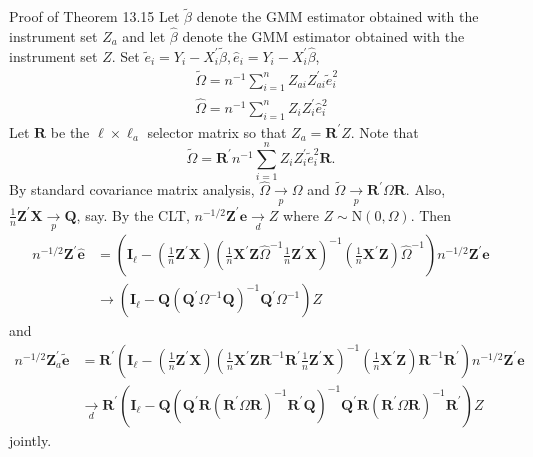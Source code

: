 \documentclass[10pt]{article}
\begin{document}
Proof of Theorem 13.15 Let $\widetilde{\beta}$ denote the GMM estimator obtained with the instrument set $Z_{a}$ and let $\widehat{\beta}$ denote the GMM estimator obtained with the instrument set $Z$. Set $\widetilde{e}_{i}=Y_{i}-X_{i}^{\prime} \widetilde{\beta}, \widehat{e}{ }_{i}=Y_{i}-X_{i}^{\prime} \widehat{\beta}$,
$$
\begin{aligned}
&\widetilde{\Omega}=n^{-1} \sum_{i=1}^{n} Z_{a i} Z_{a i}^{\prime} \widetilde{e}_{i}^{2} \\
&\widehat{\Omega}=n^{-1} \sum_{i=1}^{n} Z_{i} Z_{i}^{\prime} \widehat{e}_{i}^{2}
\end{aligned}
$$
Let $\boldsymbol{R}$ be the $\ell \times \ell_{a}$ selector matrix so that $Z_{a}=\boldsymbol{R}^{\prime} Z$. Note that
$$
\widetilde{\Omega}=\boldsymbol{R}^{\prime} n^{-1} \sum_{i=1}^{n} Z_{i} Z_{i}^{\prime} \widetilde{e}_{i}^{2} \boldsymbol{R} .
$$
By standard covariance matrix analysis, $\widehat{\Omega} \underset{p}{\rightarrow} \Omega$ and $\widetilde{\Omega} \underset{p}{\rightarrow} \boldsymbol{R}^{\prime} \Omega \boldsymbol{R}$. Also, $\frac{1}{n} \boldsymbol{Z}^{\prime} \boldsymbol{X} \underset{p}{\rightarrow} \boldsymbol{Q}$, say. By the CLT, $n^{-1 / 2} \boldsymbol{Z}^{\prime} \boldsymbol{e} \underset{d}{\longrightarrow} Z$ where $Z \sim \mathrm{N}(0, \Omega)$. Then
$$
\begin{aligned}
n^{-1 / 2} \boldsymbol{Z}^{\prime} \widehat{\boldsymbol{e}} &=\left(\boldsymbol{I}_{\ell}-\left(\frac{1}{n} \boldsymbol{Z}^{\prime} \boldsymbol{X}\right)\left(\frac{1}{n} \boldsymbol{X}^{\prime} \boldsymbol{Z} \widehat{\Omega}^{-1} \frac{1}{n} \boldsymbol{Z}^{\prime} \boldsymbol{X}\right)^{-1}\left(\frac{1}{n} \boldsymbol{X}^{\prime} \boldsymbol{Z}\right) \widehat{\Omega}^{-1}\right) n^{-1 / 2} \boldsymbol{Z}^{\prime} \boldsymbol{e} \\
& \rightarrow\left(\boldsymbol{I}_{\ell}-\boldsymbol{Q}\left(\boldsymbol{Q}^{\prime} \Omega^{-1} \boldsymbol{Q}\right)^{-1} \boldsymbol{Q}^{\prime} \Omega^{-1}\right) Z
\end{aligned}
$$
and
$$
\begin{aligned}
n^{-1 / 2} \boldsymbol{Z}_{a}^{\prime} \widetilde{\boldsymbol{e}} &=\boldsymbol{R}^{\prime}\left(\boldsymbol{I}_{\ell}-\left(\frac{1}{n} \boldsymbol{Z}^{\prime} \boldsymbol{X}\right)\left(\frac{1}{n} \boldsymbol{X}^{\prime} \boldsymbol{Z} \boldsymbol{R}^{-1} \boldsymbol{R}^{\prime} \frac{1}{n} \boldsymbol{Z}^{\prime} \boldsymbol{X}\right)^{-1}\left(\frac{1}{n} \boldsymbol{X}^{\prime} \boldsymbol{Z}\right) \boldsymbol{R}^{-1} \boldsymbol{R}^{\prime}\right) n^{-1 / 2} \boldsymbol{Z}^{\prime} \boldsymbol{e} \\
& \underset{d}{\longrightarrow} \boldsymbol{R}^{\prime}\left(\boldsymbol{I}_{\ell}-\boldsymbol{Q}\left(\boldsymbol{Q}^{\prime} \boldsymbol{R}\left(\boldsymbol{R}^{\prime} \Omega \boldsymbol{R}\right)^{-1} \boldsymbol{R}^{\prime} \boldsymbol{Q}\right)^{-1} \boldsymbol{Q}^{\prime} \boldsymbol{R}\left(\boldsymbol{R}^{\prime} \Omega \boldsymbol{R}\right)^{-1} \boldsymbol{R}^{\prime}\right) Z
\end{aligned}
$$
jointly.
\end{document}
